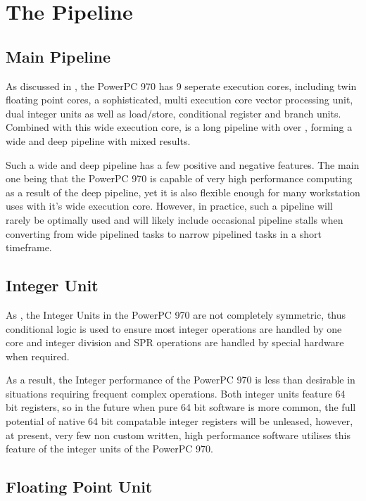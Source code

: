 \documentclass[a4paper,12pt]{article}
\begin{document}
\section{The Pipeline}

\subsection{Main Pipeline}

As discussed in \cite[this article]{a2}, the PowerPC 970 has 9 seperate
execution cores, including twin floating point cores, a sophisticated,
multi execution core vector processing unit, dual integer units as well
as load/store, conditional register and branch units. Combined with this
wide execution core, is a long pipeline with over 
\cite[100 execution slots]{a1}, forming a wide and deep pipeline with
mixed results.


Such a wide and deep pipeline has a few positive and negative features.
The main one being that the PowerPC 970 is capable of very high
performance computing as a result of the deep pipeline, yet it is also
flexible enough for many workstation uses with it's wide execution core.
However, in practice, such a pipeline will rarely be optimally used and
will likely include occasional pipeline stalls when converting from wide
pipelined tasks to narrow pipelined tasks in a short timeframe.

\subsection{Integer Unit}

As \cite[discussed in detail]{a2}, the Integer Units in the PowerPC 970 are not
completely symmetric, thus conditional logic is used to ensure 
most integer operations are handled by one core and integer division 
and SPR operations are handled by special hardware when required.


As a result, the Integer performance of the PowerPC 970 is less than desirable
in situations requiring frequent complex operations. Both integer units
feature 64 bit registers, so in the future when pure 64 bit software is
more common, the full potential of native 64 bit compatable integer
registers will be unleased, however, at present, very few non custom
written, high performance software utilises this feature of the integer
units of the PowerPC 970.
 
\subsection{Floating Point Unit}
\end{document}
